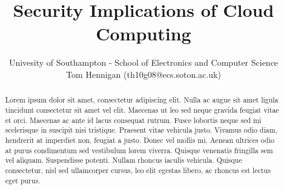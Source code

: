 \documentclass[10pt,a4paper]{article}
\title{Security Implications of Cloud Computing}
\author{Univesity of Southampton - School of Electronics and Computer Science \\
Tom Hennigan (th10g08@ecs.soton.ac.uk)}
\begin{document}
\maketitle

\begin{abstract}
Lorem ipsum dolor sit amet, consectetur adipiscing elit. Nulla ac augue sit amet ligula tincidunt consectetur sit amet vel elit. Maecenas ut leo sed neque gravida feugiat vitae et orci. Maecenas ac ante id lacus consequat rutrum. Fusce lobortis neque sed mi scelerisque in suscipit nisi tristique. Praesent vitae vehicula justo. Vivamus odio diam, hendrerit at imperdiet non, feugiat a justo. Donec vel mollis mi. Aenean ultrices odio at purus condimentum sed vestibulum lorem viverra. Quisque venenatis fringilla sem vel aliquam. Suspendisse potenti. Nullam rhoncus iaculis vehicula. Quisque consectetur, nisl sed ullamcorper cursus, leo elit egestas libero, ac rhoncus est lectus eget purus.
\end{abstract}
\end{document}
